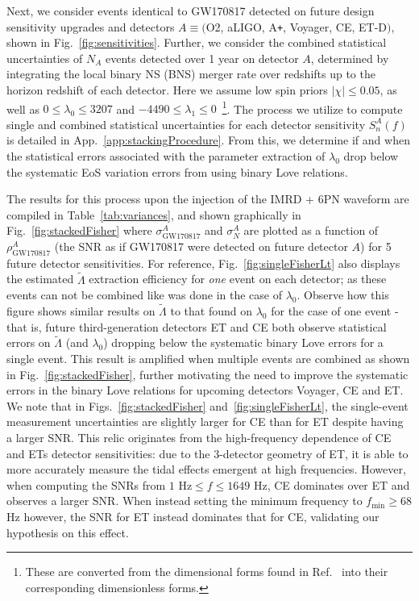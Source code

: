 \documentclass[prd,twocolumn,nofootinbib,superscriptaddress,amsmath,amssymb]{revtex4-1}
\begin{document}
Next, we consider events identical to GW170817 detected on future design sensitivity upgrades and detectors $A \equiv ($O2, aLIGO, A\texttt{+}, Voyager, CE, ET-D$)$, shown in Fig.~\ref{fig:sensitivities}.
Further, we consider the combined statistical uncertainties of $N_A$ events detected over 1 year on detector $A$, determined by integrating the local binary NS (BNS) merger rate over redshifts up to the horizon redshift of each detector.
Here we assume low spin priors $|\chi| \leq 0.05$, as well as $0 \leq \lambda_0 \leq 3207$ and $-4490 \leq \lambda_1 \leq 0$~\cite{delPozzo:TaylorTidal}\footnote{These are converted from the dimensional forms found in Ref.~\cite{delPozzo:TaylorTidal} into their corresponding dimensionless forms.}.
The process we utilize to compute single and combined statistical uncertainties for each detector sensitivity $S_n^A(f)$ is detailed in App.~\ref{app:stackingProcedure}.
From this, we determine if and when the statistical errors associated with the parameter extraction of $\lambda_0$ drop below the systematic EoS variation errors from using binary Love relations.

The results for this process upon the injection of the IMRD + 6PN waveform are compiled in Table~\ref{tab:variances}, and shown graphically in Fig.~\ref{fig:stackedFisher} where $\sigma^A_{\text{GW170817}}$ and $\sigma^A_N$ are plotted as a function of $\rho^A_{\text{GW170817}}$ (the SNR as if GW170817 were detected on future detector $A$) for 5 future detector sensitivities.
For reference, Fig.~\ref{fig:singleFisherLt} also displays the estimated $\tilde\Lambda$ extraction efficiency for \emph{one} event on each detector; as these events can not be combined like was done in the case of $\lambda_0$.
Observe how this figure shows similar results on $\tilde\Lambda$ to that found on $\lambda_0$ for the case of one event - that is, future third-generation detectors ET and CE both observe statistical errors on $\tilde\Lambda$ (and $\lambda_0$) dropping below the systematic binary Love errors for a single event.
This result is amplified when multiple events are combined as shown in Fig.~\ref{fig:stackedFisher}, further motivating the need to improve the systematic errors in the binary Love relations for upcoming detectors Voyager, CE and ET.
We note that in Figs.~\ref{fig:stackedFisher} and~\ref{fig:singleFisherLt}, the single-event measurement uncertainties are slightly larger for CE than for ET despite having a larger SNR.
This relic originates from the high-frequency dependence of CE and ETs detector sensitivities: due to the 3-detector geometry of ET, it is able to more accurately measure the tidal effects emergent at high frequencies.
However, when computing the SNRs from $1 \text{ Hz} \leq f \leq 1649 \text{ Hz}$, CE dominates over ET and observes a larger SNR.
When instead setting the minimum frequency to $f_{\text{min}} \geq 68$ Hz however, the SNR for ET instead dominates that for CE, validating our hypothesis on this effect.
\end{document}
